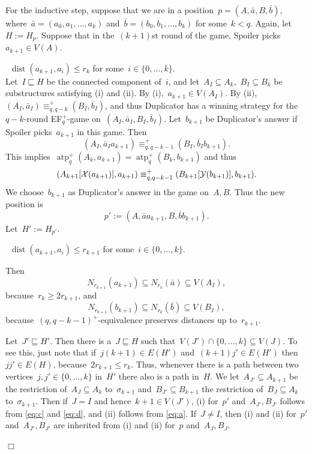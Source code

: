 \documentclass[11pt]{article}
\numberwithin{equation}{section}
\newcommand{\YYY}{\mathcal{Y}} \newcommand{\ZZZ}{\mathcal{Z}}
\newcommand{\atp}{\operatorname{atp}^+}
\newcommand{\dist}{\operatorname{dist}}
\newcommand{\case}[1]{\par\medskip\noindent\textit{Case #1: }}
\newenvironment{cs}{
  \begin{description}
    \renewcommand{\case}[1]{\item[\itshape\mdseries Case ##1:]}
  }{
  \end{description}
}
\newcommand{\tup}[1]{\bar{#1}}
\def\qed{\hspace*{\fill}$\Box$}
\newenvironment{proof}[1][]%
{\ifthenelse{\equal{#1}{}}{\noindent\textit{Proof.
    }}{\noindent\textit{#1. }}}%
{\qed\par\smallskip}
\begin{document}
\begin{proof}
  For the inductive step, suppose that we are in a position~$p=(A,\tup
  a,B,\tup b)$, where~$\tup a=(a_0,a_1,\ldots,a_k)$ and~$\tup
  b=(b_0,b_1,\ldots,b_k)$ for some~$k<q$. Again, let~$H :=
  H_p$. Suppose that in the~$(k+1)$st round of the game, Spoiler
  picks~$a_{k+1}\in V(A)$.
  \begin{cs}
    \case1~$\dist(a_{k+1},a_i)\le r_{k}$ for some~$i\in \{0,\ldots,k\}$.\\
    Let~$I\sqsubseteq H$ be the connected component of~$i$, and
    let~$A_I\subseteq A_k$,~$B_I\subseteq B_k$ be substructures
    satisfying (i) and (ii).  By (i),~$a_{k+1}\in V(A_I)$. By (ii),~$(A_I,
    \tup{a}_I)\equiv_{q,q-k}^+(B_I, \tup{b}_I)$, and thus Duplicator
    has a winning strategy for
    the~$q-k$-round EF$_q^+$-game on~$(A_I, \tup{a}_I,
    B_I,\tup{b}_I)$.  Let~$b_{k+1}$ be Duplicator's answer if Spoiler
    picks~$a_{k+1}$ in this game. Then
    \begin{equation}
      \label{eq:a}
      (A_I,\bar a_Ia_{k+1})\equiv^+_{q,q-k-1} (B_I,\bar b_Ib_{k+1}).
    \end{equation}
    This implies~$\atp_q(A_k,a_{k+1})=\atp_q(B_k,b_{k+1})$ and thus
    \begin{equation}
      \label{eq:b}
      (A_{k+1}[\XXX(a_{k+1})],a_{k+1})\equiv^+_{q,q-k-1}(B_{k+1}[\YYY(b_{k+1})],b_{k+1}).
    \end{equation}
    We choose~$b_{k+1}$ as Duplicator's answer in the game
    on~$A,B$. Thus the new position is
    \[
    p':=(A,\tup aa_{k+1},B,\tup
    bb_{k+1}).
    \]
    Let~$H':=H_{p'}$. 
    \begin{cs}
      \case{1a}~$\dist(a_{k+1},a_i)\le r_{k+1}$ for some~$i\in
      \{0,\ldots,k\}$.

      Then 
      \begin{equation}
        N_{r_{k+1}}(a_{k+1})\subseteq N_{r_k}(\tup a)\subseteq V(A_I),\label{eq:c}
      \end{equation}
      because~$r_k\ge 2r_{k+1}$, and
      \begin{equation}
        \label{eq:d}
        N_{r_{k+1}}(b_{k+1})\subseteq
        N_{r_k}(\tup b)\subseteq V(B_I),
      \end{equation}
      because~$(q,q-k-1)^+$-equivalence preserves distances up
      to~$r_{k+1}$.

      Let~$J'\sqsubseteq H'$. Then there is a~$J\sqsubseteq H$ such
      that~$V(J')\cap\{0,\ldots,k\}\subseteq V(J)$. To see this, just
      note that if~$j(k+1)\in E(H')$ and~$(k+1)j'\in E(H')$
      then~$jj'\in E(H)$, because~$2r_{k+1}\le r_k$. Thus, whenever
      there is a path between two vertices~$j,j'\in\{0,\ldots,k\}$
      in~$H'$ there also is a path in~$H$. We let~$A_{J'}\subseteq
      A_{k+1}$ be the restriction of~$A_J\subseteq A_k$
      to~$\sigma_{k+1}$ and~$B_{J'}\subseteq B_{k+1}$ the restriction
      of~$B_J\subseteq A_k$ to~$\sigma_{k+1}$. Then if~$J=I$ and
      hence~$k+1\in V(J')$, (i) for~$p'$ and~$A_{J'},B_{J'}$ follows
      from \eqref{eq:c} and \eqref{eq:d}, and (ii) follows from
      \eqref{eq:a}. If~$J\neq I$, then (i) and (ii) for~$p'$
      and~$A_{J'},B_{J'}$ are inherited from (i) and (ii) for~$p$
      and~$A_J,B_J$.


\end{cs}
\end{cs}
\end{proof}
\end{document}
